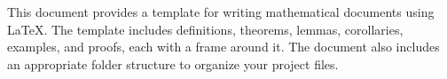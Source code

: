 This document provides a template for writing mathematical documents using \LaTeX. The template includes definitions, theorems, lemmas, corollaries, examples, and proofs, each with a frame around it. The document also includes an appropriate folder structure to organize your project files.

